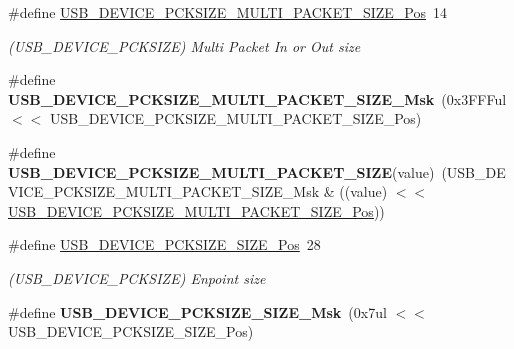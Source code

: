 \begin{DoxyCompactItemize}
\item 
\hypertarget{group___s_a_m_l21___u_s_b_ga663e8d8f53a4de69483b4b48f0f3d142}{}\#define \hyperlink{group___s_a_m_l21___u_s_b_ga663e8d8f53a4de69483b4b48f0f3d142}{U\+S\+B\+\_\+\+D\+E\+V\+I\+C\+E\+\_\+\+P\+C\+K\+S\+I\+Z\+E\+\_\+\+M\+U\+L\+T\+I\+\_\+\+P\+A\+C\+K\+E\+T\+\_\+\+S\+I\+Z\+E\+\_\+\+Pos}~14\label{group___s_a_m_l21___u_s_b_ga663e8d8f53a4de69483b4b48f0f3d142}

\begin{DoxyCompactList}\small\item\em (U\+S\+B\+\_\+\+D\+E\+V\+I\+C\+E\+\_\+\+P\+C\+K\+S\+I\+Z\+E) Multi Packet In or Out size \end{DoxyCompactList}\item 
\hypertarget{group___s_a_m_l21___u_s_b_ga1e8a646f023e8f7d592838d317fdfdc5}{}\#define {\bfseries U\+S\+B\+\_\+\+D\+E\+V\+I\+C\+E\+\_\+\+P\+C\+K\+S\+I\+Z\+E\+\_\+\+M\+U\+L\+T\+I\+\_\+\+P\+A\+C\+K\+E\+T\+\_\+\+S\+I\+Z\+E\+\_\+\+Msk}~(0x3\+F\+F\+Ful $<$$<$ U\+S\+B\+\_\+\+D\+E\+V\+I\+C\+E\+\_\+\+P\+C\+K\+S\+I\+Z\+E\+\_\+\+M\+U\+L\+T\+I\+\_\+\+P\+A\+C\+K\+E\+T\+\_\+\+S\+I\+Z\+E\+\_\+\+Pos)\label{group___s_a_m_l21___u_s_b_ga1e8a646f023e8f7d592838d317fdfdc5}

\item 
\hypertarget{group___s_a_m_l21___u_s_b_gaddc60e72230326dd00194f7ec1ee6645}{}\#define {\bfseries U\+S\+B\+\_\+\+D\+E\+V\+I\+C\+E\+\_\+\+P\+C\+K\+S\+I\+Z\+E\+\_\+\+M\+U\+L\+T\+I\+\_\+\+P\+A\+C\+K\+E\+T\+\_\+\+S\+I\+Z\+E}(value)~(U\+S\+B\+\_\+\+D\+E\+V\+I\+C\+E\+\_\+\+P\+C\+K\+S\+I\+Z\+E\+\_\+\+M\+U\+L\+T\+I\+\_\+\+P\+A\+C\+K\+E\+T\+\_\+\+S\+I\+Z\+E\+\_\+\+Msk \& ((value) $<$$<$ \hyperlink{group___s_a_m_l21___u_s_b_ga663e8d8f53a4de69483b4b48f0f3d142}{U\+S\+B\+\_\+\+D\+E\+V\+I\+C\+E\+\_\+\+P\+C\+K\+S\+I\+Z\+E\+\_\+\+M\+U\+L\+T\+I\+\_\+\+P\+A\+C\+K\+E\+T\+\_\+\+S\+I\+Z\+E\+\_\+\+Pos}))\label{group___s_a_m_l21___u_s_b_gaddc60e72230326dd00194f7ec1ee6645}

\item 
\hypertarget{group___s_a_m_l21___u_s_b_ga50418bff1c552e987f4925cb91cf32b9}{}\#define \hyperlink{group___s_a_m_l21___u_s_b_ga50418bff1c552e987f4925cb91cf32b9}{U\+S\+B\+\_\+\+D\+E\+V\+I\+C\+E\+\_\+\+P\+C\+K\+S\+I\+Z\+E\+\_\+\+S\+I\+Z\+E\+\_\+\+Pos}~28\label{group___s_a_m_l21___u_s_b_ga50418bff1c552e987f4925cb91cf32b9}

\begin{DoxyCompactList}\small\item\em (U\+S\+B\+\_\+\+D\+E\+V\+I\+C\+E\+\_\+\+P\+C\+K\+S\+I\+Z\+E) Enpoint size \end{DoxyCompactList}\item 
\hypertarget{group___s_a_m_l21___u_s_b_gac8f37693735e2fd0c6ef9445ba2edd44}{}\#define {\bfseries U\+S\+B\+\_\+\+D\+E\+V\+I\+C\+E\+\_\+\+P\+C\+K\+S\+I\+Z\+E\+\_\+\+S\+I\+Z\+E\+\_\+\+Msk}~(0x7ul $<$$<$ U\+S\+B\+\_\+\+D\+E\+V\+I\+C\+E\+\_\+\+P\+C\+K\+S\+I\+Z\+E\+\_\+\+S\+I\+Z\+E\+\_\+\+Pos)\label{group___s_a_m_l21___u_s_b_gac8f37693735e2fd0c6ef9445ba2edd44}


\end{DoxyCompactItemize}
